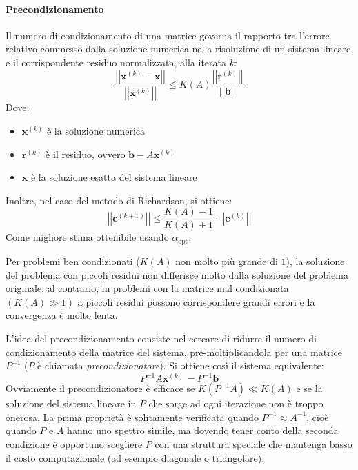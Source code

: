 \newpage

\paragraph{Precondizionamento}

Il numero di condizionamento di una matrice governa il rapporto tra l'errore relativo commesso dalla soluzione numerica nella risoluzione di un sistema lineare e il corrispondente residuo normalizzata, alla iterata $k$:
\begin{equation*}
    \dfrac{
        \left|\left| \mathbf{x}^{\left(k\right)} - \mathbf{x} \right|\right|
    }{
        \left|\left| \mathbf{x}^{\left(k\right)} \right|\right|
    } 
    \le
    K\left(A\right) \dfrac{
        \left|\left| \mathbf{r}^{\left(k\right)} \right|\right|
    }{
        \left|\left| \mathbf{b} \right|\right|
    }
\end{equation*}
Dove:
\begin{itemize}
    \item $\mathbf{x}^{\left(k\right)}$ è la soluzione numerica
    \item $\mathbf{r}^{\left(k\right)}$ è il residuo, ovvero $\mathbf{b} - A\mathbf{x}^{\left(k\right)}$
    \item $\mathbf{x}$ è la soluzione esatta del sistema lineare
\end{itemize}
Inoltre, nel caso del metodo di Richardson, si ottiene:
\begin{equation*}
    \left|\left| \mathbf{e}^{\left(k+1\right)} \right|\right|
    \le
    \dfrac{K\left(A\right)-1}{K\left(A\right)+1}
    \cdot
    \left|\left| \mathbf{e}^{\left(k\right)} \right|\right|
\end{equation*}
Come migliore stima ottenibile usando $\alpha_{\text{opt}}$.

\highspace
Per problemi ben condizionati ($K\left(A\right)$ non molto più grande di $1$), la soluzione del problema con piccoli residui non differisce molto dalla soluzione del problema originale; al contrario, in problemi con la matrice mal condizionata $\left(K\left(A\right) \gg  1\right)$ a piccoli residui possono corrispondere grandi errori e la convergenza è molto lenta.

\highspace
L'idea del precondizionamento consiste nel cercare di ridurre il numero di condizionamento della matrice del sistema, pre-moltiplicandola per una matrice $P^{-1}$ ($P$ è chiamata \emph{precondizionatore}). Si ottiene così il sistema equivalente:
\begin{equation*}
    P^{-1}A\mathbf{x}^{\left(k\right)} = P^{-1}\mathbf{b}
\end{equation*}
Ovviamente il precondizionatore è efficace se $K\left(P^{-1}A\right) \ll K\left(A\right)$ e se la soluzione del sistema lineare in $P$ che sorge ad ogni iterazione non è troppo onerosa. La prima proprietà è solitamente verificata quando $P^{-1} \approx A^{-1}$, cioè quando $P$ e $A$ hanno uno spettro simile, ma dovendo tener conto della seconda condizione è opportuno scegliere $P$ con una struttura speciale che mantenga basso il costo computazionale (ad esempio diagonale o triangolare).

